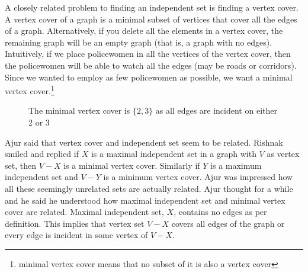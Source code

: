 A closely related problem to finding an independent set is finding a vertex cover. A vertex cover of a graph is a minimal subset of vertices that cover all the edges of a graph. Alternatively, if you delete all the elements in a vertex cover, the remaining graph will be an empty graph (that is, a graph with no edges). Intuitively, if we place policewomen in all the vertices of the vertex cover, then the policewomen will be able to watch all the edges (may be roads or corridors). Since we wanted to employ as few policewomen as possible, we want a minimal vertex cover.\footnote{minimal vertex cover means that no subset of it is also a vertex cover}
\begin{figure}
\begin{center}

\caption{ The minimal vertex cover  is $\{2,3\}$ as all edges are incident on either 2 or 3}\label{13g5}
\end{center}
\end{figure}

Ajur said that vertex cover and independent set seem to be related. Rishnak smiled and replied if $X$ is a maximal independent set in a graph with $V$ as vertex set, then $V-X$ is a minimal vertex cover. Similarly if $Y$ is a maximum independent set and $V-Y$ is a minimum vertex cover. Ajur was impressed how all these seemingly unrelated sets are actually related. Ajur thought for a while and he said he understood how maximal independent set and minimal vertex cover are related. Maximal independent set, $X$, contains no edges as per definition. This implies that vertex set  $V-X$ covers all edges of the graph or every edge is incident in some vertex of $V-X$.

